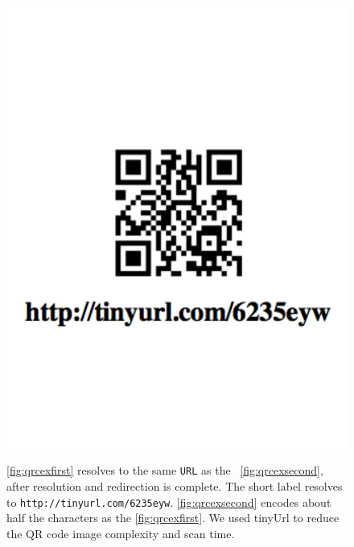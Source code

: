 \begin{figure}[htb!]
\begin{center}
{            \includegraphics[scale=0.35]{figs/qrcex}
        }
\end{center}
\caption{
	\ref{fig:qrcexfirst} resolves to the same \texttt{URL} as the ~\ref{fig:qrcexsecond}, after resolution and
	redirection is complete. 
	The short label resolves to \texttt{http://tinyurl.com/6235eyw}.  \ref{fig:qrcexsecond} encodes about half
	the characters as the \ref{fig:qrcexfirst}.
	We used tinyUrl to reduce the QR code image complexity and scan time.
     }%
\label{fig:qrcexcomp}
\end{figure}




